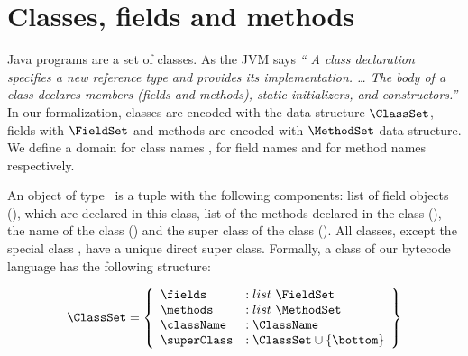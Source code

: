 
 \section{Classes, fields and methods}\label{clazz}
 Java programs are a set of classes. As the JVM says \textit{`` A class declaration specifies a new reference type and provides its implementation. \ldots
 The body of a class declares members (fields and methods), static initializers, and constructors.''}
 In our formalization, classes are encoded  with the data structure $\ClassSet$,  fields with $\FieldSet$ and
 methods are encoded with $\MethodSet$ data structure. 
 We define a domain for class names \ClassName, for field names \FieldName{} and for method names \MethodName{} respectively.

 An object of type \ClassSet \ is a tuple with the following components: list of field objects (\fields), which are declared in this class,
 list of the methods declared in the class (\methods), the name of the class (\className)   and the super class of the class (\superClass).
 All classes, except the special class \Object, have a unique direct super class. Formally, a class of our bytecode language 
 has the following structure:


 $$ \begin{array}{l}
         \ClassSet = \left\{\begin{array}{ll} \fields    & :    list \ \FieldSet \\
                                          \methods    & :    list \ \MethodSet\\
					  \className  & :   \ClassName \\
					  \superClass & :   \ClassSet \cup \{ \bottom \}
                    \end{array} \right\}
   \end{array} $$

